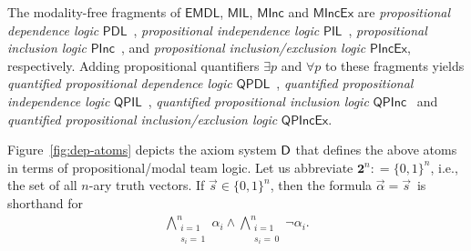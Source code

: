 \documentclass[a4paper,english,fleqn,11pt,final]{scrartcl}
\makeatletter
\newcommand{\ie}{i.e.\@\xspace}
\newcommand{\logic}[1]{\ensuremath{\mathsf{#1}}\xspace}
\newcommand{\QPDL}{\logic{QPDL}}
\newcommand{\PDL}{\logic{PDL}}
\newcommand{\EMDL}{\logic{EMDL}}
\newcommand{\MINC}{\logic{MInc}}
\newcommand{\MINCEX}{\logic{MIncEx}}
\newcommand{\QPINC}{\logic{QPInc}}
\newcommand{\QPINCEX}{\logic{QPIncEx}}
\newcommand{\PINCEX}{\logic{PIncEx}}
\newcommand{\PINC}{\logic{PInc}}
\newcommand{\QPIND}{\logic{QPIL}}
\newcommand{\PIL}{\logic{PIL}}
\newcommand{\MIL}{\logic{MIL}}
\newcommand{\sfD}{\protect\ensuremath{\mathsf{D}}}
\providecommand{\dfn}{\mathrel{\mathop:}=}
\theoremstyle{plain}
\theoremstyle{definition}
\makeatother
\begin{document}
\smallskip

The modality-free fragments of $\EMDL$, $\MIL$, $\MINC$ and $\MINCEX$ are \emph{propositional dependence logic} $\PDL$~\cite{yang_propositional_2016},
\emph{propositional independence logic} $\PIL$~\cite{hannula_complexity_2015},
\emph{propositional inclusion logic} $\PINC$~\cite{hannula_complexity_2015}, and
\emph{propositional inclusion/exclusion logic} $\PINCEX$, respectively.
Adding propositional quantifiers $\exists p$ and $\forall p$ to these fragments yields \emph{quantified propositional dependence logic} $\QPDL$~\cite{gandalf},
\emph{quantified propositional independence logic} $\QPIND$~\cite{gandalf},
\emph{quantified propositional inclusion logic} $\QPINC$~\cite{gandalf} and
\emph{quantified propositional inclusion/exclusion logic} $\QPINCEX$.



Figure~\ref{fig:dep-atoms} depicts the axiom system $\sfD$ that defines the above atoms in terms of propositional/modal team logic.
Let us abbreviate $\mathbf{2}^n \dfn \{0,1\}^n$, \ie, the set of all $n$-ary truth vectors. If $\vec s \in \{0,1\}^n$, then the formula $\vec \alpha = \vec s\,$ is shorthand for
\begin{align*}
\bigwedge^n_{\substack{i=1 \\s_i = \,1}} \alpha_i \land \bigwedge^n_{\substack{i=1\\s_i = \,0}} \neg\alpha_i\text{.}
\end{align*}
\end{document}
